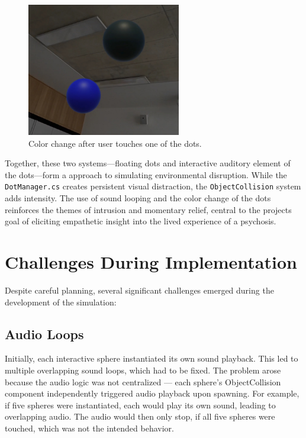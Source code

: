 \begin{figure}[H]
    \centering
    \includegraphics[width=0.6\textwidth]{../../Figures/dots-after-touch.jpg}
    \caption{Color change after user touches one of the dots.}
    \label{fig:dots_after}
\end{figure}


Together, these two systems—floating dots and interactive auditory element of the dots—form a approach to simulating environmental disruption. While the \texttt{DotManager.cs} creates persistent visual distraction, the \texttt{ObjectCollision} system adds intensity. The use of sound looping and the color change of the dots reinforces the themes of intrusion and momentary relief, central to the projects goal of eliciting empathetic insight into the lived experience of a psychosis.


\section{Challenges During Implementation} 
Despite careful planning, several significant challenges emerged during the development of the simulation:

\subsection{Audio Loops} 
Initially, each interactive sphere instantiated its own sound playback. This led to multiple overlapping sound loops, which had to be fixed. The problem arose because the audio logic was not centralized — each sphere's ObjectCollision component independently triggered audio playback upon spawning. For example, if five spheres were instantiated, each would play its own sound, leading to overlapping audio. The audio would then only stop, if all five spheres were touched, which was not the intended behavior.


